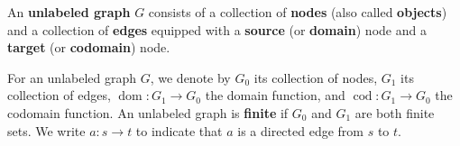 \begin{definition}
    \label{def:graph:unlabeled}
    An \textbf{unlabeled graph} \( G \) consists of a collection of \textbf{nodes} (also called \textbf{objects}) and a collection of \textbf{edges} equipped with a \textbf{source} (or \textbf{domain}) node and a \textbf{target} (or \textbf{codomain}) node. 
    
    For an unlabeled graph \( G \), we denote by \( G_0 \) its collection of nodes, \( G_1 \) its collection of edges, \( \operatorname{dom}:G_1{\to}G_0 \) the domain function, and \( \operatorname{cod}:G_1{\to}G_0 \) the codomain function. An unlabeled graph is \textbf{finite} if \( G_0 \) and \( G_1 \) are both finite sets.
    We write \( a: s \mathop{\to} t \) to indicate that \( a \) is a directed edge from \( s \) to \( t \).
\end{definition}   